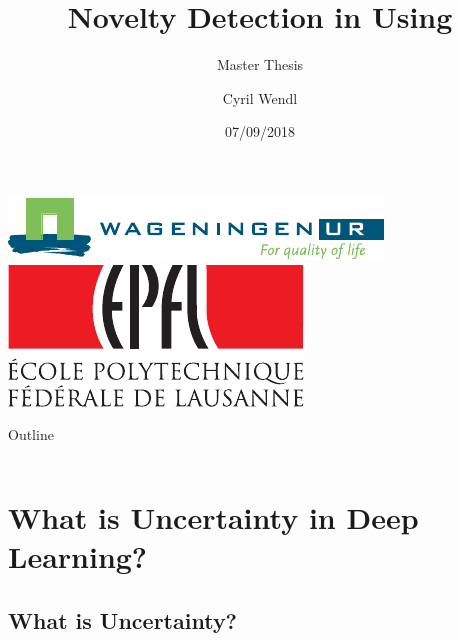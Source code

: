 \documentclass{beamer}
\title[Novelty Detection in CNNs]{Novelty Detection in \acrlongpl{CNN} Using \acrlongpl{DF}
}
\subtitle{Master Thesis}
\author{Cyril Wendl}
\institute[EPFL] 
{
	Environmental Sciences and Engineering\\
	EPFL
}
\date[07/09/2018]{07/09/2018}
\begin{document}
	
	\begin{frame}
	\centering\includegraphics[height=.6cm]{logo_wur_quality_of_life}\hspace{.5cm}\includegraphics[height=.6cm]{logo}
	\titlepage
\end{frame}
\begin{frame}{Outline}
\begin{columns}[t]
	\begin{column}{.5\textwidth}
		\tableofcontents[sections={1-2}]
	\end{column}
	\begin{column}{.5\textwidth}
		\tableofcontents[sections={3-5}]
	\end{column}
\end{columns}
\end{frame}



\section{What is Uncertainty in Deep Learning?}
\subsection{What is Uncertainty?}
\end{document}
